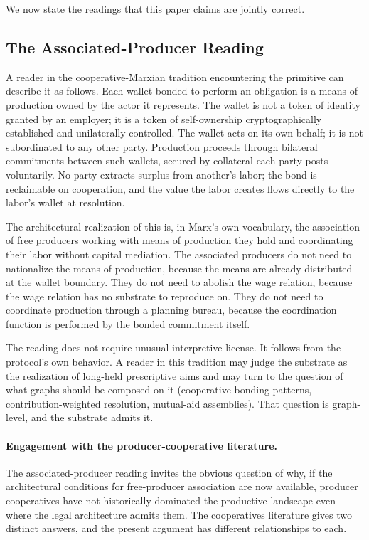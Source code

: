 \documentclass[11pt,a4paper]{article}
\theoremstyle{remark}
\begin{document}
We now state the readings that this paper claims are jointly
correct.

\subsection{The Associated-Producer Reading}
\label{sec:associated-producer}

A reader in the cooperative-Marxian tradition encountering the
primitive can describe it as follows. Each wallet bonded to
perform an obligation is a means of production owned by the actor
it represents. The wallet is not a token of identity granted by
an employer; it is a token of self-ownership cryptographically
established and unilaterally controlled. The wallet acts on its
own behalf; it is not subordinated to any other party. Production
proceeds through bilateral commitments between such wallets,
secured by collateral each party posts voluntarily. No party
extracts surplus from another's labor; the bond is reclaimable on
cooperation, and the value the labor creates flows directly to the
labor's wallet at resolution.

The architectural realization of this is, in Marx's own
vocabulary, the association of free producers working with means
of production they hold and coordinating their labor without
capital mediation. The associated producers do not need to
nationalize the means of production, because the means are
already distributed at the wallet boundary. They do not need to
abolish the wage relation, because the wage relation has no
substrate to reproduce on. They do not need to coordinate
production through a planning bureau, because the coordination
function is performed by the bonded commitment itself.

The reading does not require unusual interpretive license. It
follows from the protocol's own behavior. A reader in this
tradition may judge the substrate as the realization of long-held
prescriptive aims and may turn to the question of what graphs
should be composed on it (cooperative-bonding patterns,
contribution-weighted resolution, mutual-aid assemblies). That
question is graph-level, and the substrate admits it.

\paragraph{Engagement with the producer-cooperative literature.}
The associated-producer reading invites the obvious question of
why, if the architectural conditions for free-producer
association are now available, producer cooperatives have not
historically dominated the productive landscape even where the
legal architecture admits them. The cooperatives literature gives
two distinct answers, and the present argument has different
relationships to each.
\end{document}
